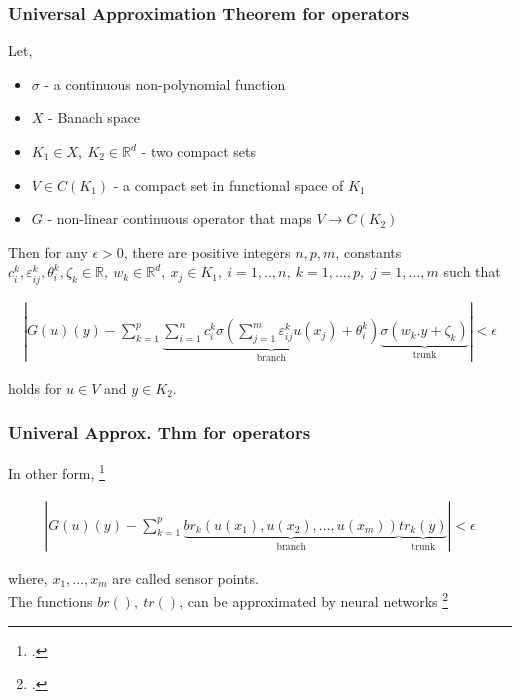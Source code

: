 \begin{frame}
    \frametitle{Universal Approximation Theorem for operators}
    \footnotesize
    Let,
    \begin{itemize}
        \item \(\sigma\) - a continuous non-polynomial function
        \item \(X\) - Banach space
        \item \(K_1 \in X, \ K_2 \in \mathbb{R}^d\) - two compact sets
        \item \(V \in C(K_1)\) - a compact set in functional space of \(K_1\)
        \item \(G\) - non-linear continuous operator that maps \(V \to C(K_2)\)
    \end{itemize}

    Then for any \(\epsilon > 0 \), there are positive integers \(n,p,m\),
    constants \(c_i^k,\varepsilon_{ij}^k,\theta_i^k,\zeta_k \in \mathbb{R}, \ w_k \in \mathbb{R}^d, \ x_j \in K_1, \ i = 1,..,n, \ k = 1,...,p, \)
    \( j = 1,...,m \) such that


    \begin{align}
        \left| G(u)(y) - \sum_{k=1}^{p}\underbrace{\sum_{i=1}^{n} c_i^k \sigma\left(\sum_{j=1}^m \varepsilon_{ij}^k u(x_j) + \theta_i^k\right)}_\text{branch}\underbrace{\sigma\left(w_k.y + \zeta_k\right)}_\text{trunk} \right| < \epsilon
    \end{align}

    holds for \(u \in V\) and \(y \in K_2\).
\end{frame}

\begin{frame}
    \frametitle{Univeral Approx. Thm for operators }
    In other form, \footcite{goswami2023physics}

    \begin{align}
        \left| G(u)(y) - \sum_{k=1}^p \underbrace{br_k\left(u(x_1),u(x_2),...,u(x_m)\right)}_\text{branch} \underbrace{tr_k\left(y\right)}_\text{trunk} \right| < \epsilon
    \end{align}


    where, \(x_1,...,x_m\) are called sensor points.\\

    \vspace{1.0cm}
    The functions \(br(), \ tr()\), can be approximated by neural networks \footcite{hornik1989multilayer}

\end{frame}

